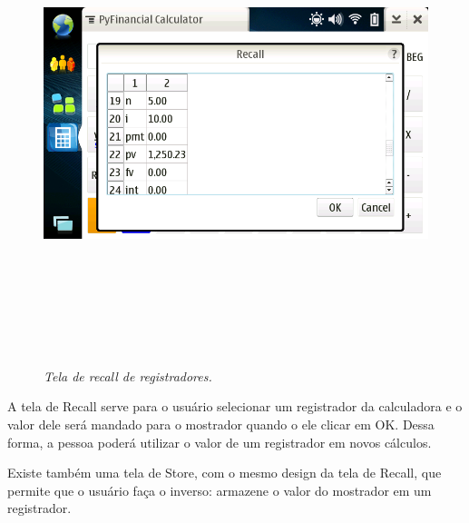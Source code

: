 \begin{figure}[!h]
 \includegraphics[height = 14cm]{tela_recall.png}
 \caption{\it Tela de recall de registradores.} \label{tab:tela_recall}
\end{figure}

A tela de Recall serve para o usuário selecionar um registrador da calculadora e o valor
dele será mandado para o mostrador quando o ele clicar em OK. Dessa forma, a pessoa poderá
utilizar o valor de um registrador em novos cálculos.

Existe também uma tela de Store, com o mesmo design da tela de Recall, que permite que o
usuário faça o inverso: armazene o valor do mostrador em um registrador.